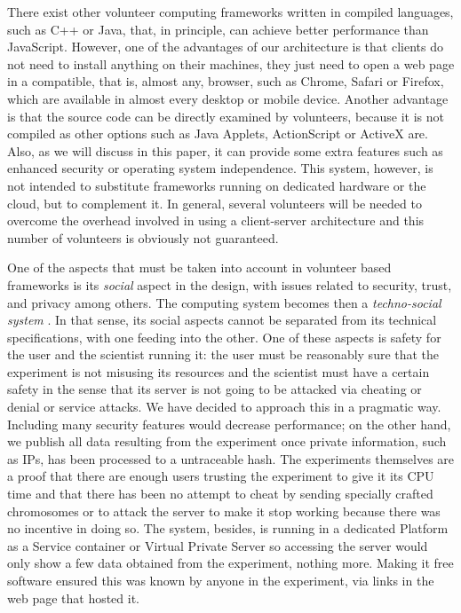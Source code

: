 \documentclass{sig-alternate}
\begin{document}
There exist other volunteer computing frameworks written in compiled languages,
such as C++ or Java, that, in principle, can achieve better performance than
JavaScript. However, one of the advantages of our architecture is that
clients do not need to install anything on their machines, they just
need to open a web page  
in a compatible, that is, almost any, browser, such as Chrome, Safari or Firefox, which are
available in almost every desktop or mobile device. Another advantage is
that the source code can be directly examined by volunteers, because it is not
compiled as other options such as Java Applets, ActionScript or
ActiveX are. Also, as we will discuss in this paper, it can provide some extra
features such as enhanced security or operating system
independence. This system, however, is not intended to substitute
frameworks running on dedicated hardware or the cloud, but to
complement it. In general, several volunteers will be needed to
overcome the overhead involved in using a client-server architecture
and this number of volunteers is obviously not guaranteed. 


One of the aspects that must be taken into account in volunteer based
frameworks is its {\em social} aspect in the design, with 
issues related to security, trust, and privacy among others. 
The computing system becomes then a {\em techno-social system}
\cite{vespignani2009predicting}. In that sense, its social aspects
cannot be separated from its technical specifications, with one
feeding into the other. One of these aspects is safety for the user
and the scientist running it: the user must be reasonably sure that the
experiment is not misusing its resources and the scientist must have a
certain safety in the sense that its server is not going to be
attacked via cheating or denial or service attacks. We have decided to
approach this in a pragmatic way. Including many security features
would decrease performance; on the other hand, we publish all data
resulting from the experiment once private information, such as IPs,
has been processed to a untraceable hash. The experiments themselves
are a proof that there are enough users trusting the experiment to
give it its CPU time and that there has been no attempt to cheat by
sending specially crafted chromosomes or to attack the server to make
it stop working because there was no incentive in doing so. The
system, besides, is running in a dedicated Platform as a Service
container or Virtual Private Server so accessing the server would only
show a few data obtained from the experiment, nothing more. Making it
free software ensured this was known by anyone in the experiment, via
links in the web page that hosted it.
\end{document}
